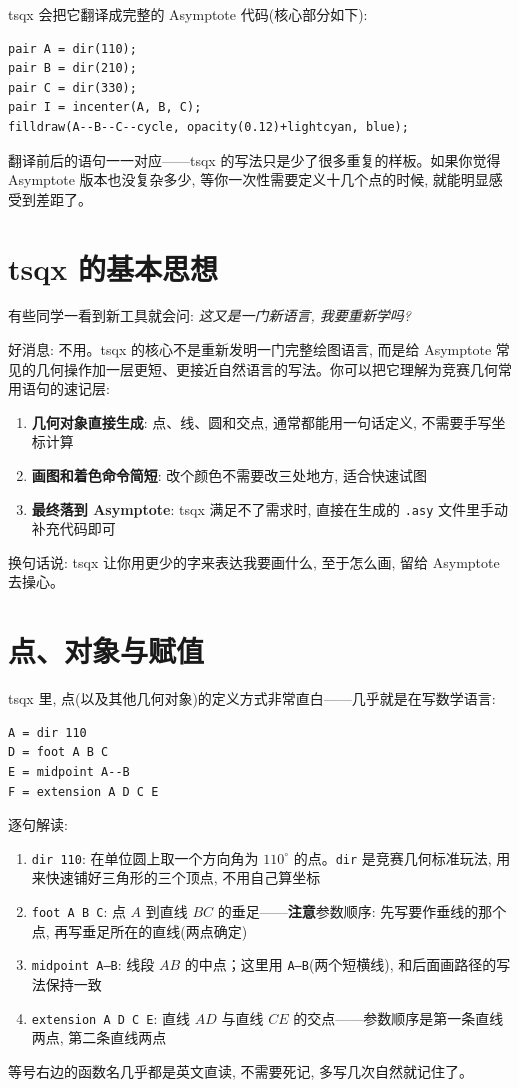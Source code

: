 \documentclass[11pt,oneside]{ctexbook}
\begin{document}
tsqx 会把它翻译成完整的 Asymptote 代码(核心部分如下):
\begin{lstlisting}[language={}]
pair A = dir(110);
pair B = dir(210);
pair C = dir(330);
pair I = incenter(A, B, C);
filldraw(A--B--C--cycle, opacity(0.12)+lightcyan, blue);
\end{lstlisting}
翻译前后的语句一一对应——tsqx 的写法只是少了很多重复的样板。如果你觉得 Asymptote 版本也没复杂多少, 等你一次性需要定义十几个点的时候, 就能明显感受到差距了。

\section{tsqx 的基本思想}
有些同学一看到新工具就会问: \textit{这又是一门新语言, 我要重新学吗?}

好消息: 不用。tsqx 的核心不是重新发明一门完整绘图语言, 而是给 Asymptote 常见的几何操作加一层更短、更接近自然语言的写法。你可以把它理解为竞赛几何常用语句的速记层:
\begin{enumerate}
	\item \textbf{几何对象直接生成}: 点、线、圆和交点, 通常都能用一句话定义, 不需要手写坐标计算
	\item \textbf{画图和着色命令简短}: 改个颜色不需要改三处地方, 适合快速试图
	\item \textbf{最终落到 Asymptote}: tsqx 满足不了需求时, 直接在生成的 \texttt{.asy} 文件里手动补充代码即可
\end{enumerate}
换句话说: tsqx 让你用更少的字来表达我要画什么, 至于怎么画, 留给 Asymptote 去操心。

\section{点、对象与赋值}
tsqx 里, 点(以及其他几何对象)的定义方式非常直白——几乎就是在写数学语言:
\begin{lstlisting}[language={}]
A = dir 110
D = foot A B C
E = midpoint A--B
F = extension A D C E
\end{lstlisting}
逐句解读:
\begin{enumerate}
	\item \texttt{dir 110}: 在单位圆上取一个方向角为 $110^\circ$ 的点。\texttt{dir} 是竞赛几何标准玩法, 用来快速铺好三角形的三个顶点, 不用自己算坐标
	\item \texttt{foot A B C}: 点 $A$ 到直线 $BC$ 的垂足——\textbf{注意}参数顺序: 先写要作垂线的那个点, 再写垂足所在的直线(两点确定)
	\item \texttt{midpoint A--B}: 线段 $AB$ 的中点；这里用 \texttt{A--B}(两个短横线), 和后面画路径的写法保持一致
	\item \texttt{extension A D C E}: 直线 $AD$ 与直线 $CE$ 的交点——参数顺序是第一条直线两点, 第二条直线两点
\end{enumerate}
等号右边的函数名几乎都是英文直读, 不需要死记, 多写几次自然就记住了。
\end{document}
